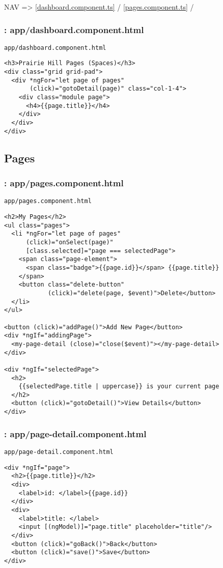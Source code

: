 \documentclass[11pt]{article}
\begin{document}
NAV => \ref{dashboard.component.ts} / \ref{pages.component.ts} /

\subsubsection{: app/dashboard.component.html}
\label{sec-3-2-1}
\begin{verbatim}
app/dashboard.component.html
\end{verbatim}
\begin{verbatim}
<h3>Prairie Hill Pages (Spaces)</h3>
<div class="grid grid-pad">
  <div *ngFor="let page of pages"
       (click)="gotoDetail(page)" class="col-1-4">
    <div class="module page">
      <h4>{{page.title}}</h4>
    </div>
  </div>
</div>
\end{verbatim}

\subsection{Pages}
\label{sec-3-3}

\subsubsection{: app/pages.component.html}
\label{sec-3-3-1}
\begin{verbatim}
app/pages.component.html
\end{verbatim}
\begin{verbatim}
<h2>My Pages</h2>
<ul class="pages">
  <li *ngFor="let page of pages"
      (click)="onSelect(page)"
      [class.selected]="page === selectedPage">
    <span class="page-element">
      <span class="badge">{{page.id}}</span> {{page.title}}
    </span>
    <button class="delete-button"
            (click)="delete(page, $event)">Delete</button>
  </li>
</ul>

<button (click)="addPage()">Add New Page</button>
<div *ngIf="addingPage">
  <my-page-detail (close)="close($event)"></my-page-detail>
</div>

<div *ngIf="selectedPage">
  <h2>
    {{selectedPage.title | uppercase}} is your current page
  </h2>
  <button (click)="gotoDetail()">View Details</button>
</div>
\end{verbatim}

\subsubsection{: app/page-detail.component.html}
\label{sec-3-3-2}
\begin{verbatim}
app/page-detail.component.html
\end{verbatim}
\begin{verbatim}
<div *ngIf="page">
  <h2>{{page.title}}</h2>
  <div>
    <label>id: </label>{{page.id}}
  </div>
  <div>
    <label>title: </label>
    <input [(ngModel)]="page.title" placeholder="title"/>
  </div>
  <button (click)="goBack()">Back</button>
  <button (click)="save()">Save</button>
</div>
\end{verbatim}
\end{document}
